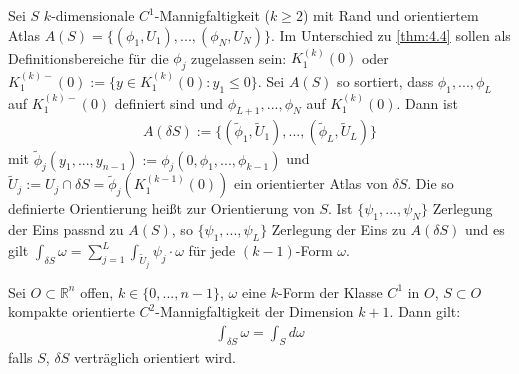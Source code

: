 \begin{theorem}[Definition] \label{thm:8.6}
  Sei $S$ $k$-dimensionale $C^1$-Mannigfaltigkeit ($k\ge 2$) mit Rand und orientiertem Atlas $A(S)=\{(\phi_1, U_1), ..., (\phi_N, U_N)\}$. 
  Im Unterschied zu \ref{thm:4.4} sollen als Definitionsbereiche für die $\phi_j$ zugelassen sein: $K_1^(k)(0)$ oder $ K_1^{(k)-}(0):=\{y\in K_1^{(k)}(0):y_1\le 0 \}$. 
  Sei $A(S)$ so sortiert, dass $\phi_1,..., \phi_L$ auf $K_1^{(k)-}(0)$ definiert sind und $\phi_{L+1},..., \phi_N$ auf $K_1^{(k)}(0)$.
  Dann ist 
  \begin{align*}
    A(\delta S):=\{(\tilde \phi_1, \tilde U_1),...,(\tilde \phi_L, \tilde U_L)\} 
  \end{align*}
  mit $\tilde \phi_j(y_1,..., y_{n-1}):=\phi_j(0, \phi_1,..., \phi_{k-1})$ und $\tilde U_j:= U_j \cap \delta S=\tilde \phi_j(K_1^{(k-1)}(0))$ ein orientierter Atlas von $\delta S$. Die so definierte Orientierung heißt   zur Orientierung von $S$.
  Ist $\{\psi_1,..., \psi_N\}$ Zerlegung der Eins passnd zu $A(S)$, so $\{\psi_1,..., \psi_L\}$ Zerlegung der Eins zu $A(\delta S)$ und es gilt $\int_{\delta S}\omega= \sum_{j=1}^L \int_{\tilde U_j} \psi_j \cdot \omega$ für jede $(k-1)$-Form $\omega$.
\end{theorem}

\begin{theorem}
  Sei $O\subset \mathbb{R}^n$ offen, $k\in \{0,..., n-1\}$, $\omega$ eine $k$-Form der Klasse $C^1$ in $O$, $S\subset O$ kompakte orientierte $C^2$-Mannigfaltigkeit der Dimension $k+1$. Dann gilt:
  \begin{align*}
    \int_{\delta S} \omega=\int_S d\omega
  \end{align*}
  falls $S$, $\delta S$ verträglich orientiert wird.
\end{theorem}

